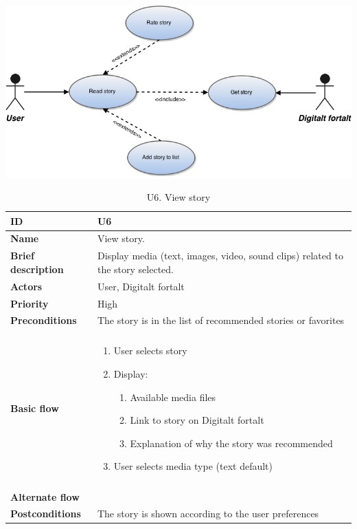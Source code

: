 \begin{table}[htp]
	\includegraphics[width=\textwidth]{fig/U6}
	\centering
	\caption{U6. View story}
	\begin{tabular}[b]{|l | l|}\hline
		\textbf{ID} 				& U6									\\\hline
		\textbf{Name} 				& View story.							\\\hline
		\textbf{Brief description}	& Display media (text, images, video, sound clips) related to the story selected. 		\\\hline
		\textbf{Actors} 			& User, Digitalt fortalt				\\\hline
		\textbf{Priority}			& High									\\\hline
		\textbf{Preconditions}		& The story is in the list of recommended stories or favorites			\\\hline&\\[-2ex]
		\textbf{Basic flow}			& \begin{minipage}{5in}
			\begin{enumerate}[noitemsep]
				\item User selects story
				\item Display:
					\begin{enumerate}
						\item Available media files
						\item Link to story on Digitalt fortalt
						\item Explanation of why the story was recommended
					\end{enumerate}
				\item User selects media type (text default)
			\end{enumerate}						
		\end{minipage}						\\\hline&\\[-2ex]
		\textbf{Alternate flow}		& \begin{minipage}{5in}
		\end{minipage}							\\\hline
		\textbf{Postconditions}		& The story is shown according to the user preferences\\\hline
	\end{tabular}
\end{table}

